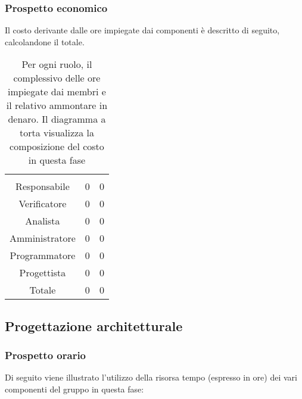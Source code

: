 \subsubsection{Prospetto economico}
Il costo derivante dalle ore impiegate dai componenti è descritto di seguito, calcolandone il totale.

\begin{table}[hbt!]
{\setlength{\parindent}{0cm}
\begin{minipage}{.43\textwidth}
	\begin{tabular}{ccc}
	\rowcolorhead
	\headertitle{Ruolo} & \headertitle{Ore} & \headertitle{Costo(€)}\\
	Responsabile & 0 & 0\\
	Verificatore & 0 & 0\\
	Analista & 0 & 0\\
	Amministratore & 0 & 0\\
	Programmatore & 0 & 0\\
	Progettista & 0 & 0\\
	\hline
	Totale & 0& 0\\
	\end{tabular}
\end{minipage}%
\begin{minipage}{.57\textwidth}
\end{minipage} }
\caption{Per ogni ruolo, il complessivo delle ore impiegate dai membri e il relativo ammontare in denaro. Il diagramma a torta visualizza la composizione del costo in questa fase}
\end{table}

\subsection{Progettazione architetturale}

\subsubsection{Prospetto orario}
Di seguito viene illustrato l'utilizzo della risorsa tempo (espresso in ore) dei vari componenti del gruppo in questa fase:

